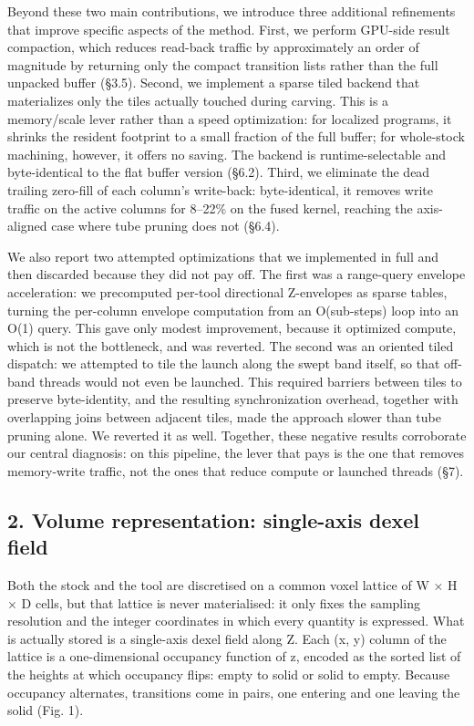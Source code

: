 \documentclass[
]{article}
\begin{document}
Beyond these two main contributions, we introduce three additional
refinements that improve specific aspects of the method. First, we
perform GPU-side result compaction, which reduces read-back traffic by
approximately an order of magnitude by returning only the compact
transition lists rather than the full unpacked buffer (§3.5). Second, we
implement a sparse tiled backend that materializes only the tiles
actually touched during carving. This is a memory/scale lever rather
than a speed optimization: for localized programs, it shrinks the
resident footprint to a small fraction of the full buffer; for
whole-stock machining, however, it offers no saving. The backend is
runtime-selectable and byte-identical to the flat buffer version (§6.2).
Third, we eliminate the dead trailing zero-fill of each column's
write-back: byte-identical, it removes write traffic on the active
columns for 8--22\% on the fused kernel, reaching the axis-aligned case
where tube pruning does not (§6.4).

We also report two attempted optimizations that we implemented in full
and then discarded because they did not pay off. The first was a
range-query envelope acceleration: we precomputed per-tool directional
Z-envelopes as sparse tables, turning the per-column envelope
computation from an O(sub-steps) loop into an O(1) query. This gave only
modest improvement, because it optimized compute, which is not the
bottleneck, and was reverted. The second was an oriented tiled dispatch:
we attempted to tile the launch along the swept band itself, so that
off-band threads would not even be launched. This required barriers
between tiles to preserve byte-identity, and the resulting
synchronization overhead, together with overlapping joins between
adjacent tiles, made the approach slower than tube pruning alone. We
reverted it as well. Together, these negative results corroborate our
central diagnosis: on this pipeline, the lever that pays is the one that
removes memory-write traffic, not the ones that reduce compute or
launched threads (§7).

\hypertarget{volume-representation-single-axis-dexel-field}{%
\subsection{2. Volume representation: single-axis dexel
field}\label{volume-representation-single-axis-dexel-field}}

Both the stock and the tool are discretised on a common voxel lattice of
W × H × D cells, but that lattice is never materialised: it only fixes
the sampling resolution and the integer coordinates in which every
quantity is expressed. What is actually stored is a single-axis dexel
field along Z. Each (x, y) column of the lattice is a one-dimensional
occupancy function of z, encoded as the sorted list of the heights at
which occupancy flips: empty to solid or solid to empty. Because
occupancy alternates, transitions come in pairs, one entering and one
leaving the solid (Fig. 1).
\end{document}
